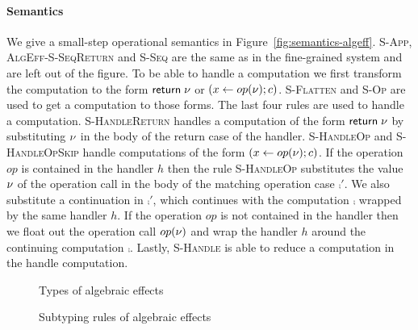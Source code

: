 {\paragraph{Semantics}
We give a small-step operational semantics in Figure~\ref{fig:semantics-algeff}.
\textsc{S-App}, \textsc{AlgEff-S-SeqReturn} and \textsc{S-Seq} are the same as in the fine-grained system and are left out of the figure.
To be able to handle a computation we first transform the computation to the form $\mathsf{return} \; \nu$ or $(x \leftarrow op(\nu) ; c)$.
\textsc{S-Flatten} and \textsc{S-Op} are used to get a computation to those forms.
The last four rules are used to handle a computation.
\textsc{S-HandleReturn} handles a computation of the form $\mathsf{return} \; \nu$ by substituting $\nu$ in the body of the return case of the handler.
\textsc{S-HandleOp} and \textsc{S-HandleOpSkip} handle computations of the form $(x \leftarrow op(\nu) ; c)$.
If the operation $op$ is contained in the handler $h$ then the rule \textsc{S-HandleOp} substitutes the value $\nu$ of the operation call in the body of the matching operation case $\comp'$.
We also substitute a continuation in $\comp'$, which continues with the computation $\comp$ wrapped by the same handler $h$.
If the operation $op$ is not contained in the handler then we float out the operation call $op(\nu)$ and wrap the handler $h$ around the continuing computation $\comp$.
Lastly, \textsc{S-Handle} is able to reduce a computation in the handle computation.

\begin{figure}
\caption{Types of algebraic effects}
\centering
{}
\end{figure}

\begin{figure}
\caption{Subtyping rules of algebraic effects}
\centering
{}
\end{figure}

}
